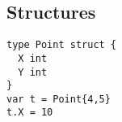 \subsection{Structures}
\begin{lstlisting}
type Point struct {
  X int
  Y int
}
var t = Point{4,5}
t.X = 10
\end{lstlisting}

